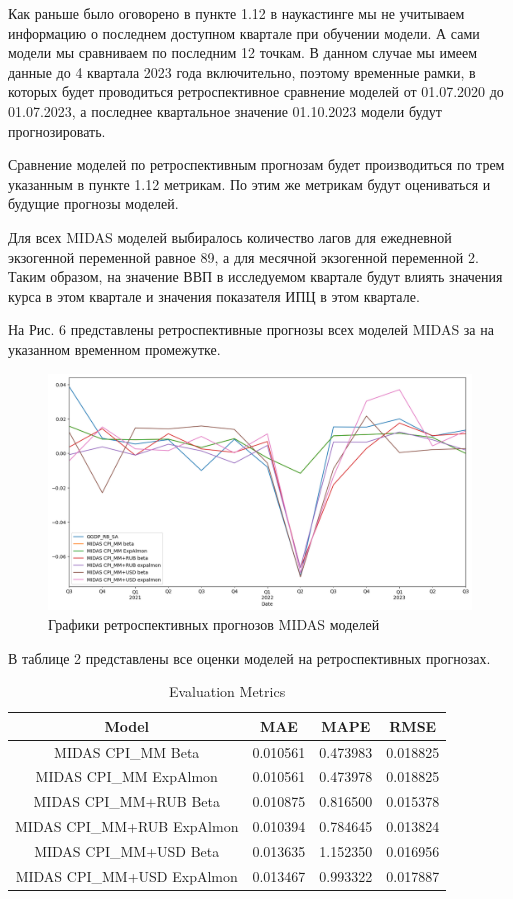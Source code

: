 \documentclass[a4paper, 12pt]{extarticle}
\numberwithin{equation}{subsection}
\begin{document}
	Как раньше было оговорено в пункте 1.12 в наукастинге мы не учитываем информацию о последнем доступном квартале при обучении модели. А сами модели мы сравниваем по последним 12 точкам. В данном случае мы имеем данные до 4 квартала 2023 года включительно, поэтому временные рамки, в которых будет проводиться ретроспективное сравнение моделей от 01.07.2020 до 01.07.2023, а последнее квартальное значение 01.10.2023 модели будут прогнозировать. 
	
	Сравнение моделей по ретроспективным прогнозам будет производиться по трем указанным в пункте 1.12 метрикам. По этим же метрикам будут оцениваться и будущие прогнозы моделей.
	
	Для всех MIDAS моделей выбиралось количество лагов для ежедневной экзогенной переменной равное 89, а для месячной экзогенной переменной 2. Таким образом, на значение ВВП в исследуемом квартале будут влиять значения курса в этом квартале и значения показателя ИПЦ в этом квартале.
	
	На Рис. 6 представлены ретроспективные прогнозы всех моделей MIDAS за на указанном временном промежутке.
	\begin{figure}[h]
		\centering
		\includegraphics[scale=0.5]{images/img06}
		\caption{Графики ретроспективных прогнозов MIDAS моделей}
		\label{fig:img06}
	\end{figure}
	
	В таблице 2 представлены все оценки моделей на ретроспективных прогнозах.
\begin{table}[h]
	\centering
	\caption{Evaluation Metrics}
	\label{tab:evaluation_metrics}
	\begin{tabular}{|c|c|c|c|}
		\hline
		Model & MAE & MAPE & RMSE \\
		\hline
		MIDAS CPI\_MM Beta          & 0.010561 & 0.473983 & 0.018825 \\
		MIDAS CPI\_MM ExpAlmon      & 0.010561 & 0.473978 & 0.018825 \\
		MIDAS CPI\_MM+RUB Beta      & 0.010875 & 0.816500 & 0.015378 \\
		MIDAS CPI\_MM+RUB ExpAlmon  & 0.010394 & 0.784645 & 0.013824 \\
		MIDAS CPI\_MM+USD Beta      & 0.013635 & 1.152350 & 0.016956 \\
		MIDAS CPI\_MM+USD ExpAlmon  & 0.013467 & 0.993322 & 0.017887 \\
		\hline
	\end{tabular}
\end{table}
\end{document}
